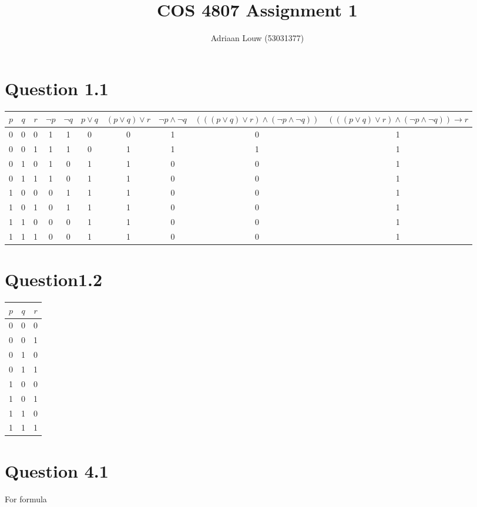 \documentclass[10pt,a4paper]{article}
\title{COS 4807 Assignment 1}
\author{Adriaan Louw (53031377)}
\begin{document}
\maketitle

\section{Question 1.1}

\begin{tabular}{|c|c|c|c|c|c|c|c|c|c|}
\hline
$p$ & $q$ & $r$ & $\neg p$ & $ \neg q$ & $p \vee q$ & $(p \vee q) \vee r$ & $\neg p \wedge \neg q$ &  $((( p \vee q) \vee r ) \wedge ( \neg p \wedge \neg q ))$ & $ ((( p \vee q) \vee r ) \wedge ( \neg p \wedge \neg q )) \rightarrow r$\\ 
\hline
 0 &  0 & 0 & 1 & 1 & 0 & 0 & 1 & 0 & 1\\
 0 &  0 & 1 & 1 & 1 & 0 & 1 & 1 & 1 & 1\\
 0 &  1 & 0 & 1 & 0 & 1 & 1 & 0 & 0 & 1\\
 0 &  1 & 1 & 1 & 0 & 1 & 1 & 0 & 0 & 1\\
 1 &  0 & 0 & 0 & 1 & 1 & 1 & 0 & 0 & 1\\
 1 &  0 & 1 & 0 & 1 & 1 & 1 & 0 & 0 & 1\\
 1 &  1 & 0 & 0 & 0 & 1 & 1 & 0 & 0 & 1\\
 1 &  1 & 1 & 0 & 0 & 1 & 1 & 0 & 0 & 1\\
\hline
\end{tabular}


\section{Question1.2}

\begin{tabular}{|c|c|c|}
\hline
$p$ & $q$ & $r$ \\ 
\hline
 0 &  0 & 0 \\
 0 &  0 & 1 \\
 0 &  1 & 0 \\
 0 &  1 & 1 \\
 1 &  0 & 0 \\
 1 &  0 & 1 \\
 1 &  1 & 0 \\
 1 &  1 & 1 \\
\hline
\end{tabular}



\section{Question 4.1}
For formula
\end{document}
